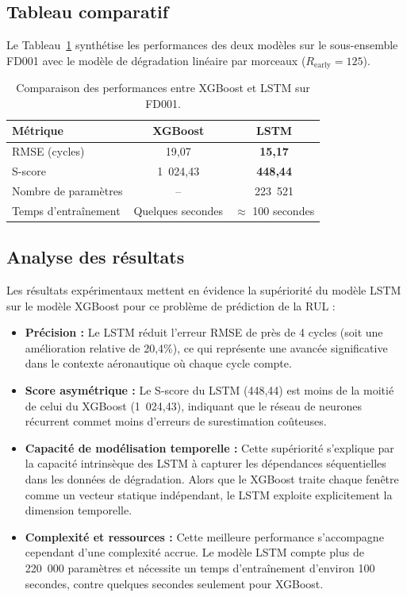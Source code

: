 \documentclass[12pt,a4paper]{report}
\theoremstyle{definition}
\begin{document}
\subsection{Tableau comparatif}

Le Tableau~\ref{tab:comparison} synthétise les performances des deux modèles sur le sous-ensemble FD001 avec le modèle de dégradation linéaire par morceaux ($R_{\text{early}} = 125$).

\begin{table}[H]
    \centering
    \caption{Comparaison des performances entre XGBoost et LSTM sur FD001.}
    \label{tab:comparison}
    \begin{tabular}{lcc}
        \toprule
        \textbf{Métrique} & \textbf{XGBoost} & \textbf{LSTM} \\
        \midrule
        RMSE (cycles) & 19,07 & \textbf{15,17} \\
        S-score & 1~024,43 & \textbf{448,44} \\
        Nombre de paramètres & -- & 223~521 \\
        Temps d'entraînement & Quelques secondes & $\approx$ 100 secondes \\
        \bottomrule
    \end{tabular}
\end{table}

\subsection{Analyse des résultats}

Les résultats expérimentaux mettent en évidence la supériorité du modèle LSTM sur le modèle XGBoost pour ce problème de prédiction de la RUL :

\begin{itemize}
    \item \textbf{Précision :} Le LSTM réduit l'erreur RMSE de près de 4 cycles (soit une amélioration relative de 20,4\%), ce qui représente une avancée significative dans le contexte aéronautique où chaque cycle compte.
    
    \item \textbf{Score asymétrique :} Le S-score du LSTM (448,44) est moins de la moitié de celui du XGBoost (1~024,43), indiquant que le réseau de neurones récurrent commet moins d'erreurs de surestimation coûteuses.
    
    \item \textbf{Capacité de modélisation temporelle :} Cette supériorité s'explique par la capacité intrinsèque des LSTM à capturer les dépendances séquentielles dans les données de dégradation. Alors que le XGBoost traite chaque fenêtre comme un vecteur statique indépendant, le LSTM exploite explicitement la dimension temporelle.
    
    \item \textbf{Complexité et ressources :} Cette meilleure performance s'accompagne cependant d'une complexité accrue. Le modèle LSTM compte plus de 220~000 paramètres et nécessite un temps d'entraînement d'environ 100 secondes, contre quelques secondes seulement pour XGBoost.
\end{itemize}
\end{document}
